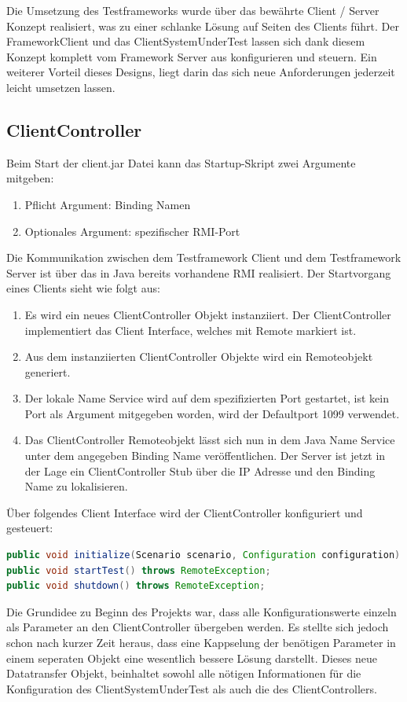 Die Umsetzung des Testframeworks wurde über das bewährte Client / Server Konzept realisiert, was zu einer schlanke Lösung auf Seiten des Clients führt. Der FrameworkClient und das ClientSystemUnderTest lassen sich dank die\-sem Konzept komplett vom Framework Server aus konfigurieren und steuern. Ein weiterer Vorteil dieses Designs, liegt darin das sich neue Anforderungen jederzeit leicht umsetzen lassen.


\subsection{ClientController}
\label{sec:clientController}
 
Beim Start der client.jar Datei kann das Startup-Skript zwei Argumente mitgeben:
\begin{enumerate}
\item Pflicht Argument: Binding Namen
\item Optionales Argument: spezifischer RMI-Port
\end{enumerate}
Die Kommunikation zwischen dem Testframework Client und dem Testframework Server ist über das in Java bereits vorhandene RMI \cite{java_rmi} realisiert. Der Startvorgang eines Clients sieht wie folgt aus:
\begin{enumerate}
\item Es wird ein neues ClientController Objekt instanziiert. Der ClientController implementiert das Client Interface, welches mit Remote markiert ist.
\item Aus dem instanziierten ClientController Objekte wird ein Remoteobjekt generiert.
\item Der lokale Name Service wird auf dem spezifizierten Port gestartet, ist kein Port als Argument mitgegeben worden, wird der Defaultport 1099 verwendet.
\item Das ClientController Remoteobjekt lässt sich nun in dem Java Name Service unter dem angegeben Binding Name veröffentlichen. Der Server ist jetzt in der Lage ein ClientController Stub über die IP Adresse und den Binding Name zu lokalisieren.
\end{enumerate}

Über folgendes Client Interface wird der ClientController konfiguriert und gesteuert:
\begin{lstlisting}[language=java, breaklines=true] 	
public void initialize(Scenario scenario, Configuration configuration) throws RemoteException;
public void startTest() throws RemoteException;
public void shutdown() throws RemoteException;
\end{lstlisting}
Die Grundidee zu Beginn des Projekts war, dass alle Konfigurationswerte einzeln als Parameter an den ClientController übergeben werden. Es stellte sich je\-doch schon nach kurzer Zeit her\-aus, dass eine Kap\-pse\-lung der be\-nötigen Para\-meter in einem seperaten Objekt eine wesentlich bessere Lösung darstellt. Dieses neue Datatransfer Objekt, beinhaltet sowohl alle nötigen Informationen für die Konfiguration des ClientSystemUnderTest als auch die des ClientControllers.

